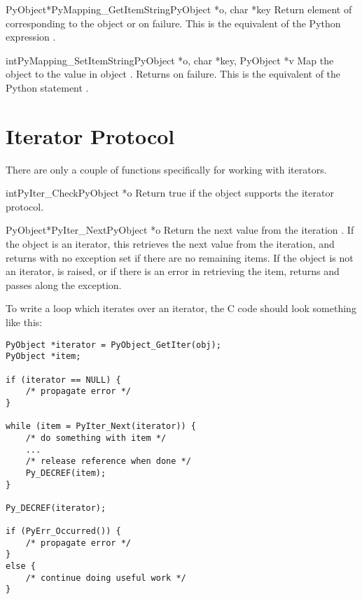 \begin{cfuncdesc}{PyObject*}{PyMapping_GetItemString}{PyObject *o, char *key}
  Return element of  corresponding to the object  or
  \NULL{} on failure. This is the equivalent of the Python expression
  .
\end{cfuncdesc}

\begin{cfuncdesc}{int}{PyMapping_SetItemString}{PyObject *o, char *key,
                                                PyObject *v}
  Map the object  to the value  in object .
  Returns  on failure.  This is the equivalent of the Python
  statement .
\end{cfuncdesc}


\section{Iterator Protocol \label{iterator}}


There are only a couple of functions specifically for working with
iterators.

\begin{cfuncdesc}{int}{PyIter_Check}{PyObject *o}
  Return true if the object  supports the iterator protocol.
\end{cfuncdesc}

\begin{cfuncdesc}{PyObject*}{PyIter_Next}{PyObject *o}
  Return the next value from the iteration .  If the object is
  an iterator, this retrieves the next value from the iteration, and
  returns \NULL{} with no exception set if there are no remaining
  items.  If the object is not an iterator,  is
  raised, or if there is an error in retrieving the item, returns
  \NULL{} and passes along the exception.
\end{cfuncdesc}

To write a loop which iterates over an iterator, the C code should
look something like this:

\begin{verbatim}
PyObject *iterator = PyObject_GetIter(obj);
PyObject *item;

if (iterator == NULL) {
    /* propagate error */
}

while (item = PyIter_Next(iterator)) {
    /* do something with item */
    ...
    /* release reference when done */
    Py_DECREF(item);
}

Py_DECREF(iterator);

if (PyErr_Occurred()) {
    /* propagate error */
}
else {
    /* continue doing useful work */
}
\end{verbatim}


